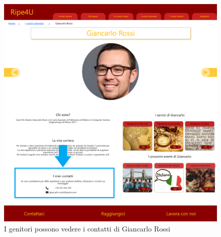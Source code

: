     \begin{figure}[H]
        \centering
        \includegraphics[scale=0.3]{resources/images/scenario1-5.png}
        \caption{I genitori possono vedere i contatti di Giancarlo Rossi}
    \end{figure}

